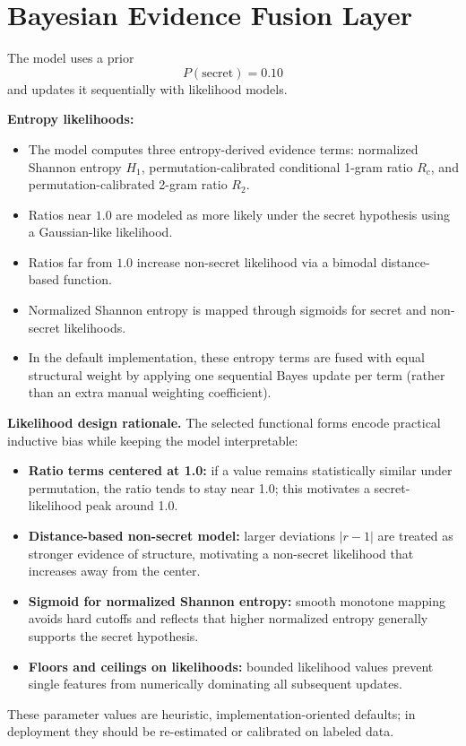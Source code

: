 \documentclass[10pt]{article}
\begin{document}
\section*{Bayesian Evidence Fusion Layer}

The model uses a prior
\[
P(\text{secret}) = 0.10
\]
and updates it sequentially with likelihood models.

\textbf{Entropy likelihoods:}
\begin{itemize}
  \item The model computes three entropy-derived evidence terms: normalized Shannon entropy $H_1$, permutation-calibrated conditional 1-gram ratio $R_c$, and permutation-calibrated 2-gram ratio $R_2$.
  \item Ratios near $1.0$ are modeled as more likely under the secret hypothesis using a Gaussian-like likelihood.
  \item Ratios far from $1.0$ increase non-secret likelihood via a bimodal distance-based function.
  \item Normalized Shannon entropy is mapped through sigmoids for secret and non-secret likelihoods.
  \item In the default implementation, these entropy terms are fused with equal structural weight by applying one sequential Bayes update per term (rather than an extra manual weighting coefficient).
\end{itemize}

\textbf{Likelihood design rationale.}
The selected functional forms encode practical inductive bias while keeping the model interpretable:
\begin{itemize}
  \item \textbf{Ratio terms centered at 1.0:} if a value remains statistically similar under permutation, the ratio tends to stay near 1.0; this motivates a secret-likelihood peak around 1.0.
  \item \textbf{Distance-based non-secret model:} larger deviations $|r-1|$ are treated as stronger evidence of structure, motivating a non-secret likelihood that increases away from the center.
  \item \textbf{Sigmoid for normalized Shannon entropy:} smooth monotone mapping avoids hard cutoffs and reflects that higher normalized entropy generally supports the secret hypothesis.
  \item \textbf{Floors and ceilings on likelihoods:} bounded likelihood values prevent single features from numerically dominating all subsequent updates.
\end{itemize}
These parameter values are heuristic, implementation-oriented defaults; in deployment they should be re-estimated or calibrated on labeled data.
\end{document}
